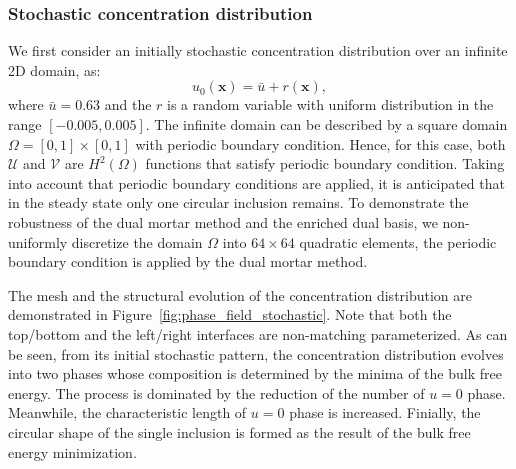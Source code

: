 \subsubsection{Stochastic concentration distribution}

We first consider an initially stochastic concentration distribution over an infinite 2D domain, as:
\begin{equation}
	u_0(\mathbf{x}) = \bar{u}+r(\mathbf{x}),
\end{equation}
where $\bar{u}=0.63$ and the $r$ is a random variable with uniform distribution in the range $\left[ -0.005, 0.005 \right]$. The infinite domain can be described by a square domain $\Omega=\left[0 , 1\right] \times \left[0 , 1\right]$ with periodic boundary condition. Hence, for this case, both $\mathcal{U}$ and $\mathcal{V}$ are $H^2(\Omega)$ functions that satisfy periodic boundary condition. Taking into account that periodic boundary conditions are applied, it is anticipated that in the steady state only one circular inclusion remains. To demonstrate the robustness of the dual mortar method and the enriched dual basis, we non-uniformly discretize the domain $\Omega$ into $64 \times 64$ quadratic elements, the periodic boundary condition is applied by the dual mortar method.\par

The mesh and the structural evolution of the concentration distribution are demonstrated in Figure~\ref{fig:phase_field_stochastic}. Note that both the top/bottom and the left/right interfaces are non-matching parameterized. As can be seen, from its initial stochastic pattern, the concentration distribution evolves into two phases whose composition is determined by the minima of the bulk free energy. The process is dominated by the reduction of the number of $u=0$ phase. Meanwhile, the characteristic length of $u=0$ phase is increased. Finially, the circular shape of the single inclusion is formed as the result of the bulk free energy minimization.

